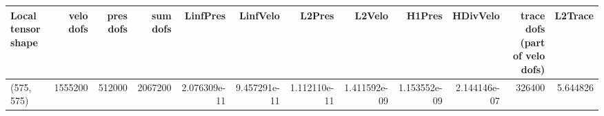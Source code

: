 \begin{tabular}{lrrrrrrrrrrr}
\toprule
Local tensor shape &  velo dofs &  pres dofs &  sum dofs &     LinfPres &     LinfVelo &       L2Pres &       L2Velo &       H1Pres &     HDivVelo &  trace dofs (part of velo dofs) &  L2Trace \\
\midrule
        (575, 575) &    1555200 &     512000 &   2067200 & 2.076309e-11 & 9.457291e-11 & 1.112110e-11 & 1.411592e-09 & 1.153552e-09 & 2.144146e-07 &                          326400 & 5.644826 \\
\bottomrule
\end{tabular}
